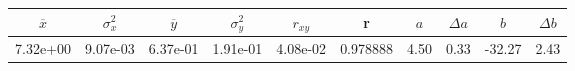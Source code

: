 \begin{tabular}{cccccccccc}
\toprule
$\overline{x}$ & $\sigma_x^2$ & $\overline{y}$ & $\sigma_y^2$ & $r_{xy}$ & r & $a$ & $\Delta a$ & $b$ & $\Delta b$ \\
\midrule
7.32e+00 & 9.07e-03 & 6.37e-01 & 1.91e-01 & 4.08e-02 & 0.978888 & 4.50 & 0.33 & -32.27 & 2.43 \\
\bottomrule
\end{tabular}
